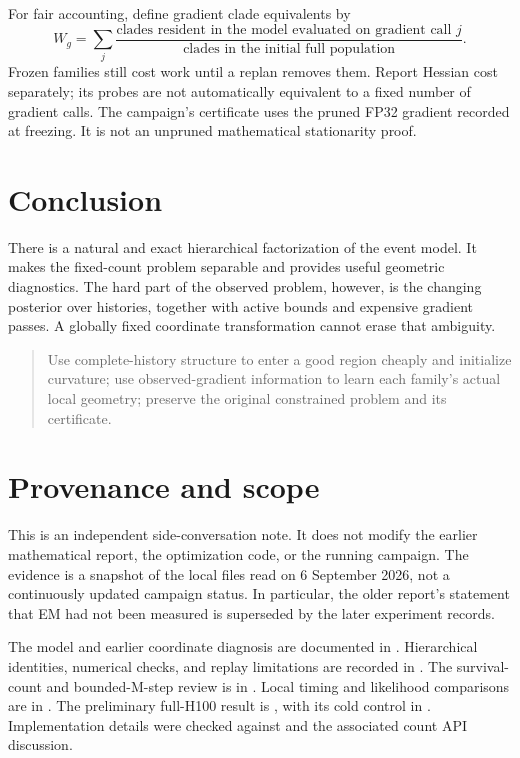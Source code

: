 \documentclass[11pt]{article}
\begin{document}
For fair accounting, define gradient clade equivalents by
\[
 W_g=\sum_j
 \frac{\text{clades resident in the model evaluated on gradient call }j}
      {\text{clades in the initial full population}}.
\]
Frozen families still cost work until a replan removes them. Report Hessian
cost separately; its probes are not automatically equivalent to a fixed number
of gradient calls. The campaign's certificate uses the pruned FP32 gradient
recorded at freezing. It is not an unpruned mathematical stationarity proof.

\section{Conclusion}

There is a natural and exact hierarchical factorization of the event model.
It makes the fixed-count problem separable and provides useful geometric
diagnostics. The hard part of the observed problem, however, is the changing
posterior over histories, together with active bounds and expensive gradient
passes. A globally fixed coordinate transformation cannot erase that ambiguity.

\begin{quote}
Use complete-history structure to enter a good region cheaply and initialize
curvature; use observed-gradient information to learn each family's actual
local geometry; preserve the original constrained problem and its certificate.
\end{quote}

\section*{Provenance and scope}

This is an independent side-conversation note. It does not modify the earlier
mathematical report, the optimization code, or the running campaign. The evidence
is a snapshot of the local files read on 6 September 2026, not a continuously
updated campaign status. In particular, the older report's statement that EM
had not been measured is superseded by the later experiment records.

The model and earlier coordinate diagnosis are documented in
. Hierarchical identities, numerical checks,
and replay limitations are recorded in
.
The survival-count and bounded-M-step review is in
.
Local timing and likelihood comparisons are in
.
The preliminary full-H100 result is
, with its
cold control in
.
Implementation details were checked against
 and the associated count API discussion.
\end{document}
